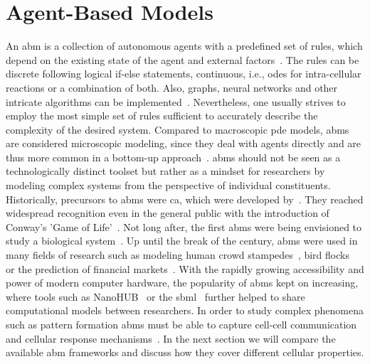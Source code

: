\section{Agent-Based Models}
\label{sec:abms}\noindent
%
An \ac{abm} is a collection of autonomous agents with a predefined set of rules, which
depend on the existing state of the agent and external
factors~\cite{Bodine2020,Metzcar2019,Tomlin2007,Nagarajan2022}.
The rules can be discrete following logical if-else statements, continuous, i.e.,
\acp{ode} for intra-cellular reactions or a combination of both.
Also, graphs, neural networks and other intricate algorithms can be implemented~\cite{Haynes1996}.
Nevertheless, one usually strives to employ the most simple set of rules sufficient to
accurately describe the complexity of the desired system.
Compared to macroscopic \ac{pde} models, \acp{abm} are considered microscopic modeling,
since they deal with agents directly and are thus more common in a bottom-up
approach~\cite{Bonabeau2002}.
\acp{abm} should not be seen as a technologically distinct toolset but rather as a
mindset for researchers by modeling complex systems from the perspective of individual constituents.
\newline
%
Historically, precursors to \acp{abm} were \acl{ca}, which were developed
by~\cite{VonNeumann1966}.
They reached widespread recognition even in the general public with the introduction of
Conway's 'Game of Life'~\cite{Games1970,Berlekamp2001}.
Not long after, the first \acp{abm} were being envisioned to study a biological
system~\cite{Schelling1971}.
Up until the break of the century, \acp{abm} were used in many fields of research such as
modeling human crowd stampedes~\cite{Helbing2000}, bird
flocks~\cite{Reynolds1987} or the prediction of financial
markets~\cite{Kephart2000}.
With the rapidly growing accessibility and power of modern computer hardware, the
popularity of \acp{abm} kept on increasing, where tools such as
NanoHUB~\cite{Klimeck2008} or the
\ac{sbml}~\cite{Keating2020} further helped to share computational
models between researchers.
In order to study complex phenomena such as pattern formation \acp{abm} must be able to
capture cell-cell communication and cellular response
mechanisms~\cite{Bajpai2021,Nakamasu2009,Schnakenberg1979,Gierer1972,Wolpert2015}.
In the next section we will compare the available \ac{abm} frameworks and discuss how
they cover different cellular properties.
%
